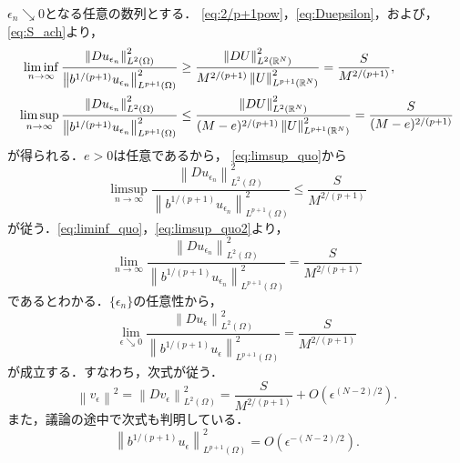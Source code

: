 $\epsilon_n \searrow 0$となる任意の数列とする．
\eqref{eq:2/p+1pow}，\eqref{eq:Duepsilon}，および，
\eqref{eq:S_ach}より，
\begin{align}
 \liminf_{n \to \infty} \frac{\left\| Du_{\epsilon_n}
 \right\|_{L^2(\Omega)}^2}{\left\| b^{1/(p+1)} u_{\epsilon_n}
 \right\|_{L^{p+1}(\Omega)}^2} &\geq 
 \frac{\left\| DU \right\|_{L^2(\mathbb{R}^N)}^2}
   {M^{2/(p+1)} \left\| U \right\|_{L^{p+1}(\mathbb{R}^N)}^2} 
 = \frac{S}{M^{2/(p+1)}}, \label{eq:liminf_quo} \\ 
 \limsup_{n \to \infty} \frac{\left\| Du_{\epsilon_n}
 \right\|_{L^2(\Omega)}^2}{\left\| b^{1/(p+1)} u_{\epsilon_n}
 \right\|_{L^{p+1}(\Omega)}^2} &\leq 
 \frac{\left\| DU \right\|_{L^2(\mathbb{R}^N)}^2}
   {(M-e)^{2/(p+1)} \left\| U \right\|_{L^{p+1}(\mathbb{R}^N)}^2} 
 = \frac{S}{(M-e)^{2/(p+1)}} \label{eq:limsup_quo}
\end{align}
が得られる．$e > 0$は任意であるから，
\eqref{eq:limsup_quo}から
\begin{equation}
 \limsup_{n \to \infty} \frac{\left\| Du_{\epsilon_n}
 \right\|_{L^2(\Omega)}^2}{\left\| b^{1/(p+1)} u_{\epsilon_n}
 \right\|_{L^{p+1}(\Omega)}^2} \leq 
 \frac{S}{M^{2/(p+1)}} \label{eq:limsup_quo2}
\end{equation}
が従う．\eqref{eq:liminf_quo}，\eqref{eq:limsup_quo2}より，
\[
 \lim_{n \to \infty} \frac{\left\| Du_{\epsilon_n}
 \right\|_{L^2(\Omega)}^2}{\left\| b^{1/(p+1)} u_{\epsilon_n}
 \right\|_{L^{p+1}(\Omega)}^2} =
 \frac{S}{M^{2/(p+1)}}
\]
であるとわかる．$\{ \epsilon_n \}$の任意性から，
\[
 \lim_{\epsilon \searrow 0} \frac{\left\| Du_{\epsilon}
 \right\|_{L^2(\Omega)}^2}{\left\| b^{1/(p+1)} u_{\epsilon}
 \right\|_{L^{p+1}(\Omega)}^2} =
 \frac{S}{M^{2/(p+1)}}
\]
が成立する．すなわち，次式が従う．
\begin{equation}
 \left\| v_\epsilon \right\|^2 = \left\| Dv_\epsilon
                                 \right\|^2_{L^2(\Omega)} 
 = \frac{S}{M^{2/(p+1)}} + O(\epsilon^{(N-2)/2}). \label{eq:vepsilon}
\end{equation}
また，議論の途中で次式も判明している．
\begin{equation}
 \left\| b^{1/(p+1)} u_\epsilon \right\|_{L^{p+1}(\Omega)}^2 = 
 O(\epsilon^{-(N-2)/2}). \label{eq:buepsilon}
\end{equation}

